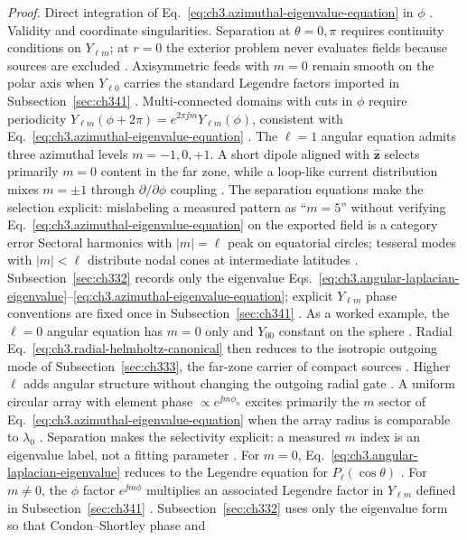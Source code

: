 \noindent\textit{Proof.}
Direct integration of Eq.~\eqref{eq:ch3.azimuthal-eigenvalue-equation} in \(\phi\) .
Validity and coordinate singularities. Separation at \(\theta=0,\pi\) requires continuity conditions on \(Y_{\ell m}\); at \(r=0\) the exterior
problem never evaluates fields because sources are excluded . Axisymmetric feeds with
\(m=0\) remain smooth on the polar axis when \(Y_{\ell 0}\) carries the standard Legendre factors imported
in Subsection~\ref{sec:ch341} . Multi-connected domains with cuts in \(\phi\) require
periodicity \(Y_{\ell m}(\phi+2\pi)=e^{2\pi\jj m}Y_{\ell m}(\phi)\), consistent with
Eq.~\eqref{eq:ch3.azimuthal-eigenvalue-equation} .
The \(\ell=1\) angular equation admits three azimuthal levels \(m=-1,0,+1\). A short dipole aligned with
\(\hat{\mathbf{z}}\) selects primarily \(m=0\) content in the far zone, while a loop-like current distribution
mixes \(m=\pm1\) through \(\partial/\partial\phi\) coupling . The separation
equations make the selection explicit: mislabeling a measured pattern as ``\(m=5\)'' without verifying
Eq.~\eqref{eq:ch3.azimuthal-eigenvalue-equation} on the exported field is a category error
Sectoral harmonics with \(|m|=\ell\) peak on equatorial circles; tesseral modes with \(|m|<\ell\) distribute
nodal cones at intermediate latitudes . Subsection~\ref{sec:ch332} records only
the eigenvalue Eqs.~\eqref{eq:ch3.angular-laplacian-eigenvalue}--\eqref{eq:ch3.azimuthal-eigenvalue-equation};
explicit \(Y_{\ell m}\) phase conventions are fixed once in Subsection~\ref{sec:ch341} .
As a worked example, the \(\ell=0\) angular equation has \(m=0\) only and \(Y_{00}\) constant on the sphere .
Radial Eq.~\eqref{eq:ch3.radial-helmholtz-canonical} then reduces to the isotropic outgoing mode of
Subsection~\ref{sec:ch333}, the far-zone carrier of compact sources . Higher \(\ell\) adds
angular structure without changing the outgoing radial gate .
A uniform circular array with element phase \(\propto e^{\jj m\phi_n}\) excites primarily the \(m\) sector of
Eq.~\eqref{eq:ch3.azimuthal-eigenvalue-equation} when the array radius is comparable to \(\lambda_0\)
. Separation makes the selectivity explicit: a measured \(m\) index is an
eigenvalue label, not a fitting parameter .
For \(m=0\), Eq.~\eqref{eq:ch3.angular-laplacian-eigenvalue} reduces to the Legendre equation for
\(P_{\ell}(\cos\theta)\) . For \(m\neq0\), the \(\phi\) factor
\(e^{\jj m\phi}\) multiplies an associated Legendre factor in \(Y_{\ell m}\) defined in Subsection~\ref{sec:ch341}
. Subsection~\ref{sec:ch332} uses only the eigenvalue form so that Condon--Shortley phase and
